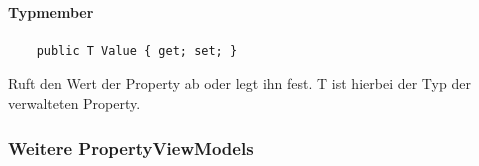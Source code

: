 \paragraph{Typmember}
\begin{itemize}

	\begin{verbatim}
	public T Value { get; set; }
	\end{verbatim}
	Ruft den Wert der Property ab oder legt ihn fest. T ist hierbei der Typ der verwalteten Property.
\end{itemize}



\subsubsection{Weitere PropertyViewModels}

